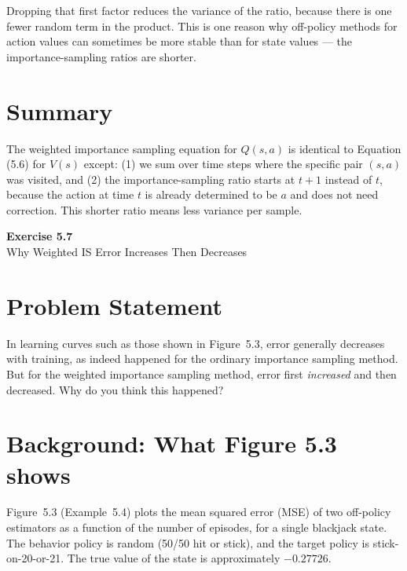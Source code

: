 \documentclass[11pt]{article}
\begin{document}
Dropping that first factor reduces the variance of the ratio, because there is one fewer random term in the product. This is one reason why off-policy methods for action values can sometimes be more stable than for state values --- the importance-sampling ratios are shorter.

\section*{Summary}

The weighted importance sampling equation for $Q(s, a)$ is identical to Equation (5.6) for $V(s)$ except: (1) we sum over time steps where the specific pair $(s, a)$ was visited, and (2) the importance-sampling ratio starts at $t + 1$ instead of $t$, because the action at time $t$ is already determined to be $a$ and does not need correction. This shorter ratio means less variance per sample.

\newpage

\begin{center}
    {\Large\color{garnet}\textbf{Exercise 5.7}}\\[6pt]
    {\large Why Weighted IS Error Increases Then Decreases}
\end{center}

\section*{Problem Statement}

In learning curves such as those shown in Figure~5.3, error generally decreases with training, as indeed happened for the ordinary importance sampling method. But for the weighted importance sampling method, error first \textit{increased} and then decreased. Why do you think this happened?

\section*{Background: What Figure 5.3 shows}

Figure~5.3 (Example~5.4) plots the mean squared error (MSE) of two off-policy estimators as a function of the number of episodes, for a single blackjack state. The behavior policy is random (50/50 hit or stick), and the target policy is stick-on-20-or-21. The true value of the state is approximately $-0.27726$.
\end{document}
